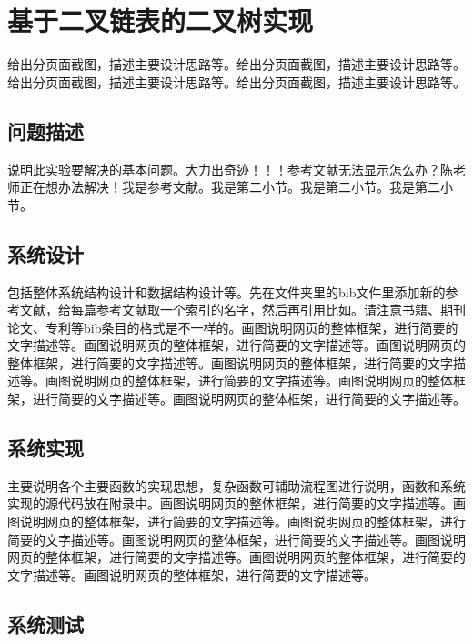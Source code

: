 \documentclass[supercite]{Experimental_Report}
\theoremstyle{definition}
\begin{document}
\newpage

\section{基于二叉链表的二叉树实现}

给出分页面截图，描述主要设计思路等。给出分页面截图，描述主要设计思路等。给出分页面截图，描述主要设计思路等。给出分页面截图，描述主要设计思路等。

\subsection{问题描述}

说明此实验要解决的基本问题。大力出奇迹！！！参考文献无法显示怎么办？陈老师正在想办法解决\cite{STR2021Neurocom, AVS2021Neurocom}！我是参考文献。我是第二小节\cite{Mehrabian1974An}。我是第二小节\cite{Rezaei2014CVPR}。我是第二小节\cite{Ramnath2008IJCV}。

\subsection{系统设计}

包括整体系统结构设计和数据结构设计等。先在文件夹里的bib文件里添加新的参考文献，给每篇参考文献取一个索引的名字，然后再引用比如\cite{STR2021Neurocom}\cite{AVS2021Neurocom, Rezaei2014CVPR}。请注意书籍、期刊论文、专利等bib条目的格式是不一样的。画图说明网页的整体框架，进行简要的文字描述等。画图说明网页的整体框架，进行简要的文字描述等。画图说明网页的整体框架，进行简要的文字描述等。画图说明网页的整体框架，进行简要的文字描述等。画图说明网页的整体框架，进行简要的文字描述等。画图说明网页的整体框架，进行简要的文字描述等。画图说明网页的整体框架，进行简要的文字描述等。

\subsection{系统实现}

主要说明各个主要函数的实现思想，复杂函数可辅助流程图进行说明，函数和系统实现的源代码放在附录中。画图说明网页的整体框架，进行简要的文字描述等。画图说明网页的整体框架，进行简要的文字描述等。画图说明网页的整体框架，进行简要的文字描述等。画图说明网页的整体框架，进行简要的文字描述等。画图说明网页的整体框架，进行简要的文字描述等。画图说明网页的整体框架，进行简要的文字描述等。画图说明网页的整体框架，进行简要的文字描述等。

\subsection{系统测试}
\end{document}
